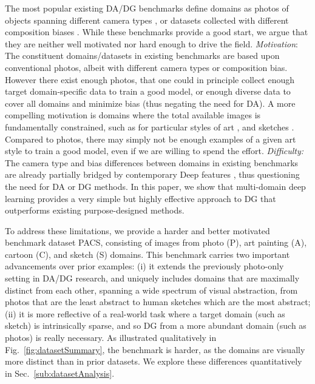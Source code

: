 \documentclass[10pt,twocolumn,letterpaper]{article}
\begin{document}
The most popular existing DA/DG benchmarks define domains as photos of objects spanning different camera types \cite{saenko2010domainAdapt}, or datasets collected with different composition biases \cite{torralba2011dataset_bias}. While these benchmarks provide a good start, we argue that they are neither well motivated nor hard enough to drive the field. \emph{Motivation}: The constituent domains/datasets in existing benchmarks are based upon conventional photos, albeit with different camera types or composition bias. However there exist enough photos, that one could in principle collect enough target domain-specific data to train a good model, or enough diverse data to cover all domains and minimize bias (thus negating the need for DA). A more compelling motivation is domains where the total available images is fundamentally constrained, such as for particular styles of art \cite{crowley2016artDetection,wu2014matchAcrossStyle}, and sketches \cite{yu2016sketchShoe,eitz2012howToSketch,yu2017sketch,song2017sketch}. Compared to photos, there may simply not be enough examples of a given art style to train a good model, even if we are willing to spend the effort. \emph{Difficulty:} The camera type and bias differences between domains in existing benchmarks are already partially bridged by contemporary Deep features \cite{donahue2014decaf,yosinski2014howTransferable}, thus questioning the need for DA or DG methods. In this paper, we show that multi-domain deep learning provides a very simple but highly effective approach to DG that outperforms existing purpose-designed methods.  



To address these limitations, we provide a harder and better motivated benchmark dataset PACS, consisting of images from photo (P), art painting (A), cartoon (C), and sketch (S) domains. This benchmark carries two important advancements over prior examples: (i) it extends the previously photo-only setting in DA/DG research, and uniquely includes domains that are maximally distinct from each other, spanning a wide spectrum of visual abstraction, from photos that are the least abstract to human sketches which are the most abstract; (ii) it is more reflective of a real-world task where a target domain (such as sketch) is intrinsically sparse, and so DG from a more abundant domain (such as photos) is really necessary. As illustrated qualitatively in Fig.~\ref{fig:datasetSummary}, the benchmark is harder, as the domains are visually more distinct than in prior datasets. We explore these differences quantitatively in Sec.~\ref{sub:datasetAnalysis}.
\end{document}
